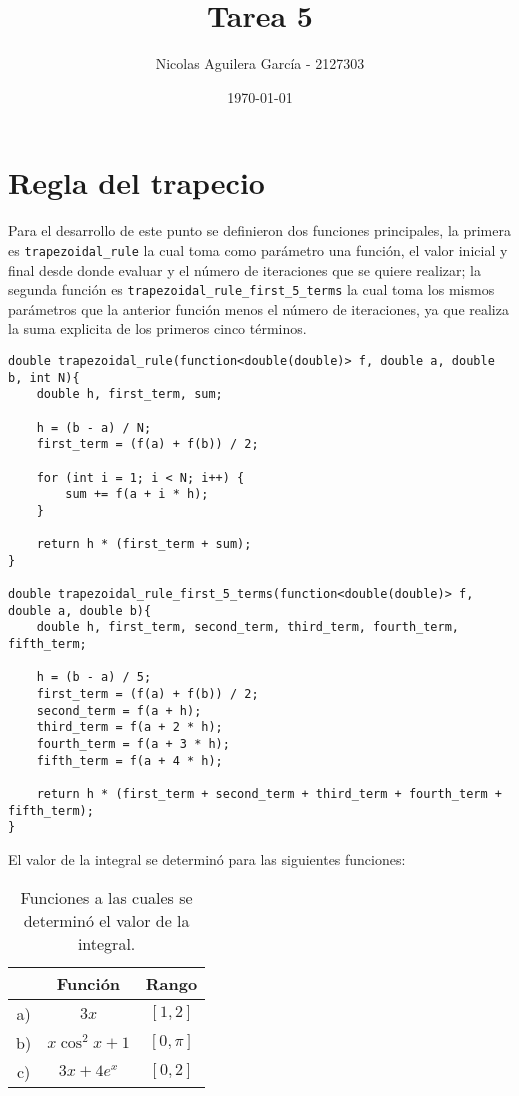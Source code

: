 \documentclass[10pt]{article}
\title{Tarea 5}
\author{Nicolas Aguilera García - 2127303}
\date{\today}
\begin{document}
    \maketitle

    \section{Regla del trapecio}
    Para el desarrollo de este punto se definieron dos funciones principales, la primera es \texttt{trapezoidal\_rule} la cual toma como parámetro una función, el valor inicial y final desde donde evaluar y el número de iteraciones que se quiere realizar; la segunda función es \texttt{trapezoidal\_rule\_first\_5\_terms} la cual toma los mismos parámetros que la anterior función menos el número de iteraciones, ya que realiza la suma explicita de los primeros cinco términos.
    
    \begin{verbatim}
double trapezoidal_rule(function<double(double)> f, double a, double b, int N){
    double h, first_term, sum;
    
    h = (b - a) / N;
    first_term = (f(a) + f(b)) / 2;

    for (int i = 1; i < N; i++) {
        sum += f(a + i * h);
    }

    return h * (first_term + sum);
}

double trapezoidal_rule_first_5_terms(function<double(double)> f, double a, double b){
    double h, first_term, second_term, third_term, fourth_term, fifth_term;
    
    h = (b - a) / 5;
    first_term = (f(a) + f(b)) / 2;
    second_term = f(a + h);
    third_term = f(a + 2 * h);
    fourth_term = f(a + 3 * h);
    fifth_term = f(a + 4 * h);

    return h * (first_term + second_term + third_term + fourth_term + fifth_term);
}
    \end{verbatim}
    
    El valor de la integral se determinó para las siguientes funciones:
    
    \begin{table}[H]
        \centering
        \begin{tabular}{|c|c|c|}
        \hline
             & \textbf{Función} & \textbf{Rango} \\ 
        \hline
            a) & $3x$ & $[1, 2]$ \\
            b) & $x\cos^2 x + 1$ & $[0, \pi]$ \\
            c) & $3x + 4 e^x$ & $[0, 2]$ \\
        \hline
        \end{tabular}
        \caption{Funciones a las cuales se determinó el valor de la integral.}
        \label{tab:funciones}
    \end{table} 
    
\end{document}

